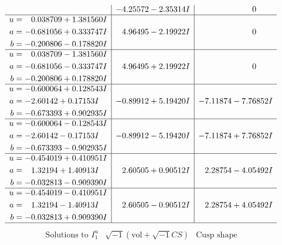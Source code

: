 \documentclass[1p]{elsarticle_modified}
\theoremstyle{definition}
\newcommand{\I}{\sqrt{-1}}
\begin{document}
$$\begin{array}{c|c|c}
 & -4.25572 - 2.35314 I & \phantom{-0.000000 } 0 \\ \hline\begin{aligned}
u &= \phantom{-}0.038709 + 1.381560 I \\
a &= -0.681056 + 0.333747 I \\
b &= -0.200806 - 0.178820 I\end{aligned}
 & \phantom{-}4.96495 - 2.19922 I & \phantom{-0.000000 } 0 \\ \hline\begin{aligned}
u &= \phantom{-}0.038709 - 1.381560 I \\
a &= -0.681056 - 0.333747 I \\
b &= -0.200806 + 0.178820 I\end{aligned}
 & \phantom{-}4.96495 + 2.19922 I & \phantom{-0.000000 } 0 \\ \hline\begin{aligned}
u &= -0.600064 + 0.128543 I \\
a &= -2.60142 + 0.17153 I \\
b &= -0.673393 + 0.902935 I\end{aligned}
 & -0.89912 + 5.19420 I & -7.11874 - 7.76852 I \\ \hline\begin{aligned}
u &= -0.600064 - 0.128543 I \\
a &= -2.60142 - 0.17153 I \\
b &= -0.673393 - 0.902935 I\end{aligned}
 & -0.89912 - 5.19420 I & -7.11874 + 7.76852 I \\ \hline\begin{aligned}
u &= -0.454019 + 0.410951 I \\
a &= \phantom{-}1.32194 + 1.40913 I \\
b &= -0.032813 - 0.909390 I\end{aligned}
 & \phantom{-}2.60505 + 0.90512 I & \phantom{-}2.28754 - 4.05492 I \\ \hline\begin{aligned}
u &= -0.454019 - 0.410951 I \\
a &= \phantom{-}1.32194 - 1.40913 I \\
b &= -0.032813 + 0.909390 I\end{aligned}
 & \phantom{-}2.60505 - 0.90512 I & \phantom{-}2.28754 + 4.05492 I\\
 \hline 
 \end{array}$$\newpage$$\begin{array}{c|c|c}  
\text{Solutions to }I^u_{1}& \I (\text{vol} + \sqrt{-1}CS) & \text{Cusp shape}\\

\end{array}$$
\end{document}
